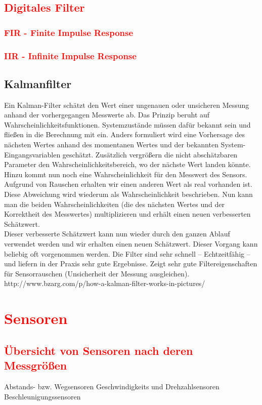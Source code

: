 		\subsection{\textcolor{red}{Digitales Filter}}
			\subsubsection{\textcolor{red}{FIR - Finite Impulse Response}}
			\subsubsection{\textcolor{red}{IIR - Infinite Impulse Response}	}		
		\subsection{Kalmanfilter}
			Ein Kalman-Filter schätzt den Wert einer ungenauen oder unsicheren Messung anhand der vorhergegangen Messwerte ab. Das Prinzip beruht auf Wahrscheinlichkeitsfunktionen. Systemzustände müssen dafür bekannt sein und fließen in die Berechnung mit ein. Anders formuliert wird eine Vorhersage des nächsten Wertes anhand des momentanen Wertes und der bekannten System-Eingangsvariablen geschätzt. Zusätzlich vergrößern die nicht abschätzbaren Parameter den Wahrscheinlichkeitsbereich, wo der nächste Wert landen könnte. Hinzu kommt nun noch eine Wahrscheinlichkeit für den Messwert des Sensors. Aufgrund von Rauschen erhalten wir einen anderen Wert als real vorhanden ist. Diese Abweichung wird wiederum als Wahrscheinlichkeit beschrieben. Nun kann man die beiden Wahrscheinlichkeiten (die des nächsten Wertes und der Korrektheit des Messwertes) multiplizieren und erhält einen neuen verbesserten Schätzwert.\\
			Dieser verbesserte Schätzwert kann nun wieder durch den ganzen Ablauf verwendet werden und wir erhalten einen neuen Schätzwert. Dieser Vorgang kann beliebig oft vorgenommen werden.
			Die Filter sind sehr schnell – Echtzeitfähig – und liefern in der Praxis sehr gute Ergebnisse. Zeigt sehr gute Filtereigenschaften für Sensorrauschen (Unsicherheit der Messung ausgleichen).\\
			http://www.bzarg.com/p/how-a-kalman-filter-works-in-pictures/
			
	\section{\textcolor{red}{Sensoren}}
		\subsection{\textcolor{red}{Übersicht von Sensoren nach deren Messgrößen}}
		Abstands- bzw. Wegsensoren
		Geschwindigkeits und Drehzahlsensoren
		Beschleunigungssensoren
